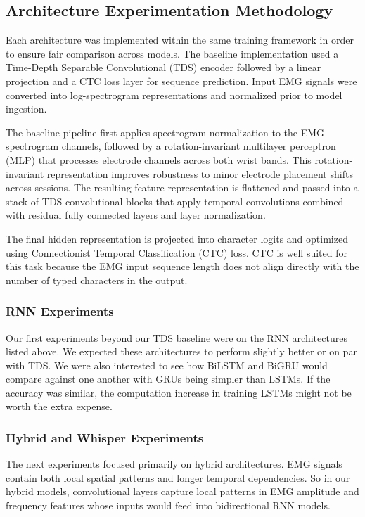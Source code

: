 \documentclass{article}
\begin{document}
\subsection{Architecture Experimentation Methodology}

Each architecture was implemented within the same training framework in order to ensure fair comparison across models. The baseline implementation used a Time-Depth Separable Convolutional (TDS) encoder followed by a linear projection and a CTC loss layer for sequence prediction. Input EMG signals were converted into log-spectrogram representations and normalized prior to model ingestion.

The baseline pipeline first applies spectrogram normalization to the EMG spectrogram channels, followed by a rotation-invariant multilayer perceptron (MLP) that processes electrode channels across both wrist bands. This rotation-invariant representation improves robustness to minor electrode placement shifts across sessions. The resulting feature representation is flattened and passed into a stack of TDS convolutional blocks that apply temporal convolutions combined with residual fully connected layers and layer normalization.

The final hidden representation is projected into character logits and optimized using Connectionist Temporal Classification (CTC) loss. CTC is well suited for this task because the EMG input sequence length does not align directly with the number of typed characters in the output.

\subsubsection{RNN Experiments}
Our first experiments beyond our TDS baseline were on the RNN architectures listed above. We expected these architectures to perform slightly better or on par with TDS. We were also interested to see how BiLSTM and BiGRU would compare against one another with GRUs being simpler than LSTMs. If the accuracy was similar, the computation increase in training LSTMs might not be worth the extra expense.

\subsubsection{Hybrid and Whisper Experiments}

The next experiments focused primarily on hybrid architectures. EMG signals contain both local spatial patterns and longer temporal dependencies. So in our hybrid models, convolutional layers capture local patterns in EMG amplitude and frequency features whose inputs would feed into bidirectional RNN models.
\end{document}

